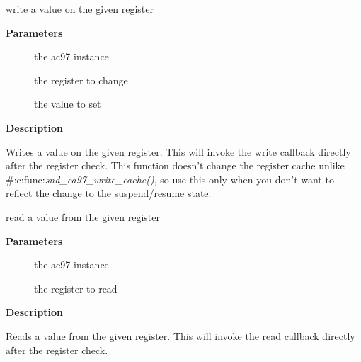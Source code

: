 \documentclass[a4paper,8pt,english]{sphinxmanual}
\begin{document}
\begin{fulllineitems}
\label{sound/kernel-api/alsa-driver-api:c.snd_ac97_write}
write a value on the given register

\end{fulllineitems}


\textbf{Parameters}
\begin{description}
\item[{}] \leavevmode
the ac97 instance

\item[{}] \leavevmode
the register to change

\item[{}] \leavevmode
the value to set

\end{description}

\textbf{Description}

Writes a value on the given register.  This will invoke the write
callback directly after the register check.
This function doesn't change the register cache unlike
\#:c:func:\emph{snd\_ca97\_write\_cache()}, so use this only when you don't want to
reflect the change to the suspend/resume state.

\begin{fulllineitems}
\label{sound/kernel-api/alsa-driver-api:c.snd_ac97_read}
read a value from the given register

\end{fulllineitems}


\textbf{Parameters}
\begin{description}
\item[{}] \leavevmode
the ac97 instance

\item[{}] \leavevmode
the register to read

\end{description}

\textbf{Description}

Reads a value from the given register.  This will invoke the read
callback directly after the register check.
\end{document}

